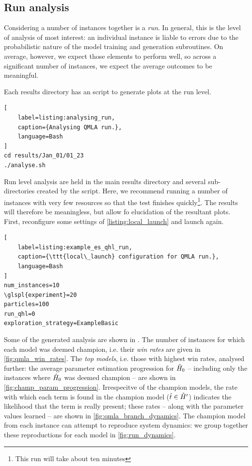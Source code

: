 \subsection{Run analysis}
Considering a number of \glspl{instance} together is a \emph{\gls{run}}. 
In general, this is the level of analysis of most interest: 
    an individual instance is liable to errors due to the probabilistic nature of 
    the model training and generation subroutines. 
On average, however, we expect those elements to perform well, 
    so across a significant number of instances, we expect the average outcomes to be meaningful. 
\par 

Each \gls{results directory} has an  script to generate plots at the \gls{run} level. 
\begin{lstlisting}[
    label=listing:analysing_run,
    caption={Analysing QMLA run.},
    language=Bash
]
cd results/Jan_01/01_23
./analyse.sh
\end{lstlisting}

Run level analysis are held in the main \gls{results directory} and several sub-directories created by the  script. 
Here, we recommend running a number of \glspl{instance} with very few resources so that the test finishes quickly\footnote{This \gls{run} will take about ten minutes}. 
The results will therefore be meaningless, but allow fo elucidation of the resultant plots. 
First, reconfigure some settings of \cref{listing:local_launch} and launch again.
\begin{lstlisting}[
    label=listing:example_es_qhl_run,
    caption={\ttt{local\_launch} configuration for QMLA run.},
    language=Bash
]
num_instances=10
\glspl{experiment}=20
particles=100
run_qhl=0
exploration_strategy=ExampleBasic
\end{lstlisting}
\par 

Some of the generated analysis are shown in . 
The number of \glspl{instance} for which each model was deemed \gls{champion}, 
i.e. their \emph{\glspl{win rate}} are given in \cref{fig:qmla_win_rates}.
The \emph{top models}, i.e. those with highest \glspl{win rate}, analysed further: 
    the average parameter estimation progression for $\hat{H}_0$ -- including only the \glspl{instance} where $\hat{H}_0$ was deemed champion --
    are shown in \cref{fig:champ_param_progression}.
Irrespecitve of the \glspl{champion model}, the rate with which each term is found in the \gls{champion model} ($\hat{t} \in \hat{H}^{\prime}$)
    indicates the \gls{likelihood} that the term is really present;
    these rates -- along with the parameter values learned -- are shown in \cref{fig:qmla_branch_dynamics}.
The \gls{champion model} from each \gls{instance} can attempt to reproduce system dynamics: 
    we group together these reproductions for each model in \cref{fig:run_dynamics}. 

